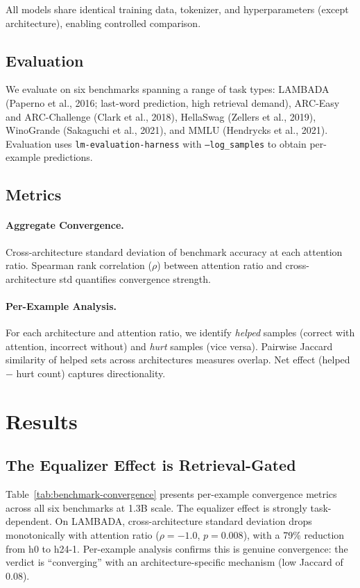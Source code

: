 \documentclass[11pt,a4paper]{article}
\begin{document}
All models share identical training data, tokenizer, and hyperparameters (except architecture), enabling controlled comparison.

\subsection{Evaluation}

We evaluate on six benchmarks spanning a range of task types: LAMBADA (Paperno et al., 2016; last-word prediction, high retrieval demand), ARC-Easy and ARC-Challenge (Clark et al., 2018), HellaSwag (Zellers et al., 2019), WinoGrande (Sakaguchi et al., 2021), and MMLU (Hendrycks et al., 2021). Evaluation uses \texttt{lm-evaluation-harness} with \texttt{--log\_samples} to obtain per-example predictions.

\subsection{Metrics}

\paragraph{Aggregate Convergence.} Cross-architecture standard deviation of benchmark accuracy at each attention ratio. Spearman rank correlation ($\rho$) between attention ratio and cross-architecture std quantifies convergence strength.

\paragraph{Per-Example Analysis.} For each architecture and attention ratio, we identify \emph{helped} samples (correct with attention, incorrect without) and \emph{hurt} samples (vice versa). Pairwise Jaccard similarity of helped sets across architectures measures overlap. Net effect (helped $-$ hurt count) captures directionality.

\section{Results}

\subsection{The Equalizer Effect is Retrieval-Gated}
\label{sec:task-specificity}

Table~\ref{tab:benchmark-convergence} presents per-example convergence metrics across all six benchmarks at 1.3B scale. The equalizer effect is strongly task-dependent. On LAMBADA, cross-architecture standard deviation drops monotonically with attention ratio ($\rho{=}{-}1.0$, $p{=}0.008$), with a 79\% reduction from h0 to h24-1. Per-example analysis confirms this is genuine convergence: the verdict is ``converging'' with an architecture-specific mechanism (low Jaccard of 0.08).
\end{document}
